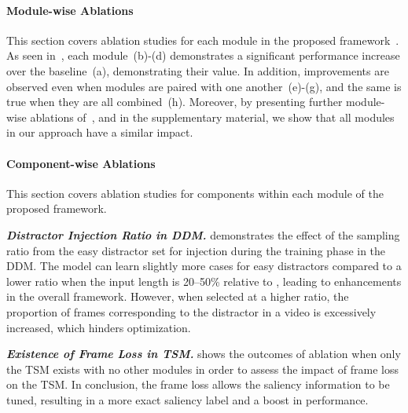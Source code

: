 \documentclass[10pt,twocolumn,letterpaper]{article}
\begin{document}
        \paragraph{Module-wise Ablations \\}
            This section covers ablation studies for each module in the proposed framework~. As seen in~, each module~(b)-(d) demonstrates a significant performance increase over the baseline~(a), demonstrating their value. In addition, improvements are observed even when modules are paired with one another~(e)-(g), and the same is true when they are all combined~(h). Moreover, by presenting further module-wise ablations of~,  and  in the supplementary material, we show that all modules in our approach have a similar impact.
            
            
            \vspace{-4mm}

        \paragraph{Component-wise Ablations \\}

            This section covers ablation studies for components within each module of the proposed framework.
            
            \noindent\textit{\textbf{Distractor Injection Ratio in DDM.}}
             demonstrates the effect of the sampling ratio from the easy distractor set for injection during the training phase in the DDM. The model can learn slightly more cases for easy distractors compared to a lower ratio when the input length is 20–50\% relative to , leading to enhancements in the overall framework. However, when selected at a higher ratio, the proportion of frames corresponding to the distractor in a video is excessively increased, which hinders optimization.

            \noindent\textit{\textbf{Existence of Frame Loss in TSM.}}
             shows the outcomes of ablation when only the TSM exists with no other modules in order to assess the impact of frame loss on the TSM. In conclusion, the frame loss allows the saliency information to be tuned, resulting in a more exact saliency label and a boost in performance.
\end{document}
